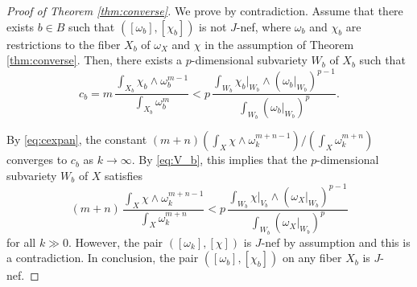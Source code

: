 \documentclass{amsart}
\numberwithin{equation}{section}
\theoremstyle{plain}
\theoremstyle{definition}
\theoremstyle{remark}
\begin{document}
\begin{proof}[Proof of Theorem \ref{thm:converse}]
We prove by contradiction. 
Assume that there exists $b \in B$ such that $([\omega_b],[\chi_b])$ is not $J$-nef, where $\omega_b$ and $\chi_b$ are restrictions to the fiber $X_b$ of $\omega_X$ and $\chi$ in the assumption of Theorem \ref{thm:converse}. 
 Then, there exists a $p$-dimensional subvariety $W_b$ of $X_b$ such that 
\begin{equation}\label{eq:V_b}
c_b = m \, \frac{\int_{X_b} \chi_b \wedge \omega_b^{m-1}}{\int_{X_b} \omega_b^m}
<
p \, \frac{\int_{W_b} \chi_b|_{W_b} \wedge \left(\omega_b|_{W_b}\right)^{p-1}}{\int_{W_b} \left(\omega_b|_{W_b}\right)^p}.
\end{equation}

By \eqref{eq:cexpan}, the constant $(m+n) \left(\int_X \chi \wedge \omega_k^{m+n-1}\right) /\left(\int_X \omega_k^{m+n}\right)$ converges to $c_b$ as $k \rightarrow \infty$.
By \eqref{eq:V_b}, this implies that the $p$-dimensional subvariety $W_b$ of $X$ satisfies 
$$(m+n) \, \frac{\int_X \chi \wedge \omega_k^{m+n-1}}{\int_X \omega_k^{m+n}}
<
p \, \frac{\int_{W_b} \chi|_{V_b} \wedge \left(\omega_X|_{W_b}\right)^{p-1}}{\int_{W_b} \left(\omega_X|_{W_b}\right)^p}$$
for all $k \gg 0$.
However, the pair $\left([\omega_k],[\chi]\right)$ is $J$-nef by assumption and this is a contradiction. 
In conclusion, the pair $([\omega_b],[\chi_b])$ on any fiber $X_b$ is $J$-nef.


\end{proof}
\end{document}
